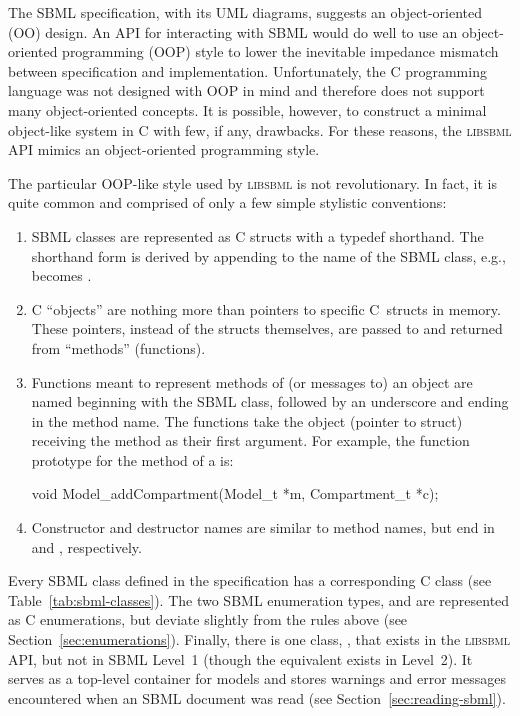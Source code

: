 \documentclass{sbmlmanual}
\newcommand{\libsbml}{\textsc{libsbml}}
\begin{document}
The SBML specification, with its UML diagrams, suggests an object-oriented
(OO) design.  An API for interacting with SBML would do well to use an
object-oriented programming (OOP) style to lower the inevitable impedance
mismatch between specification and implementation.  Unfortunately, the C
programming language was not designed with OOP in mind and therefore does
not support many object-oriented concepts.  It is possible, however, to
construct a minimal object-like system in C with few, if any, drawbacks.
For these reasons, the \libsbml{} API mimics an object-oriented programming
style.

The particular OOP-like style used by \libsbml{} is not
revolutionary.  In fact, it is quite common and comprised of only a
few simple stylistic conventions:

\begin{enumerate}

  \item SBML classes are represented as C structs with a typedef
  shorthand.  The shorthand form is derived by appending 
  to the name of the SBML class, e.g.,  becomes
  .

  \item C ``objects'' are nothing more than pointers to specific
  C~structs in memory.  These pointers, instead of the structs
  themselves, are passed to and returned from ``methods'' (functions).

  \item Functions meant to represent methods of (or messages to) an
  object are named beginning with the SBML class, followed by an
  underscore and ending in the method name.  The functions take the
  object (pointer to struct) receiving the method as their first
  argument.  For example, the function prototype for the
   method of a  is:

    \begin{example}[c]
    void Model_addCompartment(Model_t *m, Compartment_t *c);
    \end{example}

  \item Constructor and destructor names are similar to method names,
  but end in  and , respectively.

\end{enumerate}


Every SBML class defined in the specification has a corresponding C class
(see Table~\vref{tab:sbml-classes}).  The two SBML enumeration types,
 and  are represented as C enumerations,
but deviate slightly from the rules above (see
Section~\ref{sec:enumerations}).  Finally, there is one class,
, that exists in the \libsbml{} API, but not in SBML
Level~1 (though the equivalent exists in Level~2).  It serves as a
top-level container for models and stores warnings and error messages
encountered when an SBML document was read (see
Section~\ref{sec:reading-sbml}).
\end{document}
